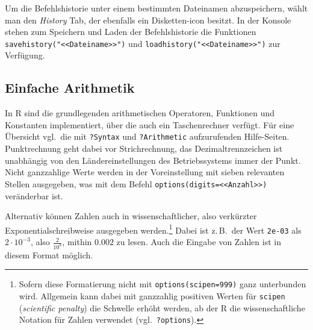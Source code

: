 Um die Befehlshistorie unter einem bestimmten Dateinamen abzuspeichern, wählt man den \emph{History} Tab, der ebenfalls ein Disketten-icon besitzt. In der Konsole stehen zum Speichern und Laden der Befehlshistorie die Funktionen \lstinline!savehistory("<<Dateiname>>")! und \lstinline!loadhistory("<<Dateiname>>")! zur Verfügung.

\subsection{Einfache Arithmetik}
\label{sec:arithmetic}

In R sind die grundlegenden arithmetischen Operatoren, Funktionen und Konstanten implementiert, über die auch ein Taschenrechner verfügt. Für eine Übersicht vgl.\ die mit \lstinline!?Syntax! und \lstinline!?Arithmetic! aufzurufenden Hilfe-Seiten. Punktrechnung geht dabei vor Strichrechnung, das Dezimaltrennzeichen ist unabhängig von den Ländereinstellungen des Betriebssystems immer der Punkt. Nicht ganzzahlige Werte werden in der Voreinstellung mit sieben relevanten Stellen ausgegeben, was mit dem Befehl \lstinline!options(digits=<<Anzahl>>)! veränderbar ist.

Alternativ können Zahlen auch in wissenschaftlicher, also verkürzter Exponentialschreibweise ausgegeben werden.\footnote{Sofern diese Formatierung nicht mit \lstinline!options(scipen=999)! ganz unterbunden wird. Allgemein kann dabei mit ganzzahlig positiven Werten für \lstinline!scipen! (\emph{scientific penalty}) die Schwelle erhöht werden, ab der R die wissenschaftliche Notation für Zahlen verwendet (vgl.\ \lstinline!?options!).} Dabei ist z.\,B.\ der Wert \lstinline!2e-03! als $2 \cdot 10^{-3}$, also $\frac{2}{10^{3}}$, mithin $0.002$ zu lesen. Auch die Eingabe von Zahlen ist in diesem Format möglich.

